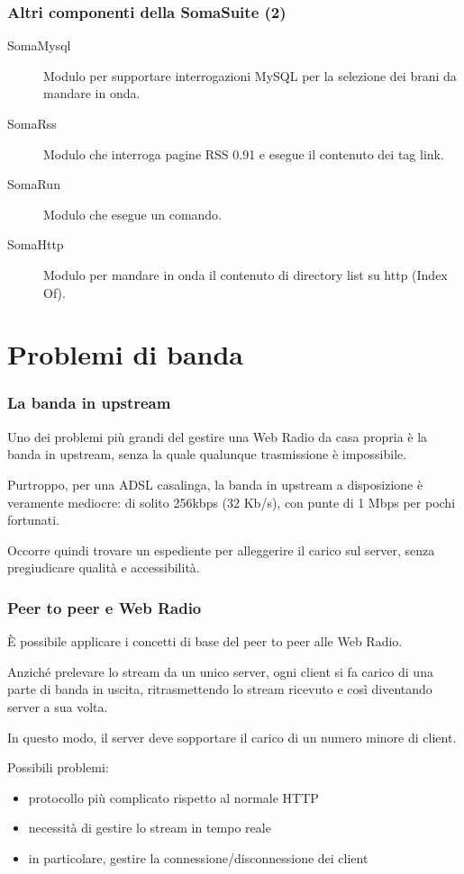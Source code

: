 \documentclass{beamer}
\begin{document}
\begin{frame}\frametitle{Altri componenti della SomaSuite (2)}
\begin{description}
\item[SomaMysql] Modulo per supportare interrogazioni MySQL per la
selezione dei brani da mandare in onda.
\item[SomaRss] Modulo che interroga pagine RSS 0.91 e esegue il
contenuto dei tag link.
\item[SomaRun] Modulo che esegue un comando.
\item[SomaHttp] Modulo per mandare in onda il contenuto di directory
list su http (Index Of).
\end{description}
\end{frame}

\section{Problemi di banda}

\begin{frame}\frametitle{La banda in upstream}
Uno dei problemi più grandi del gestire una Web Radio da casa propria
è la banda in upstream, senza la quale qualunque trasmissione è
impossibile.

Purtroppo, per una ADSL casalinga, la banda in upstream a disposizione
è veramente mediocre: di solito 256kbps (32 Kb/s), con punte di 1 Mbps
per pochi fortunati.

Occorre quindi trovare un espediente per alleggerire il carico sul
server, senza pregiudicare qualità e accessibilità.
\end{frame}

\begin{frame}\frametitle{Peer to peer e Web Radio}
È possibile applicare i concetti di base del peer to peer alle Web
Radio.

Anziché prelevare lo stream da un unico server, ogni client si fa
carico di una parte di banda in uscita, ritrasmettendo lo stream
ricevuto e così diventando server a sua volta.

In questo modo, il server deve sopportare il carico di un numero
minore di client.

Possibili problemi:
\begin{itemize}
\item protocollo più complicato rispetto al normale HTTP
\item necessità di gestire lo stream in tempo reale
\item in particolare, gestire la connessione/disconnessione dei client
\end{itemize}
\end{frame}
\end{document}

